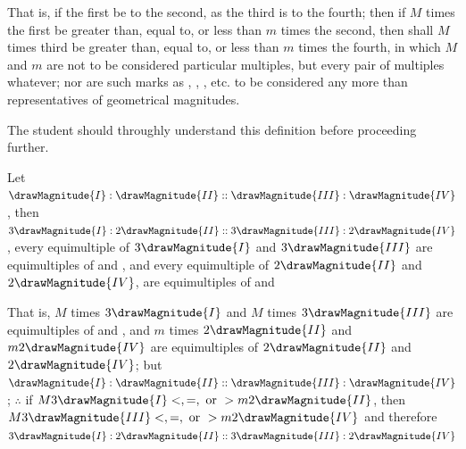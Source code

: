 \documentclass[booklanguage=english]{byrnebook}
\begin{document}
That is, if the first be to the second, as the third is to the fourth; then if $M$ times the first be greater than, equal to, or less than $m$ times the second, then shall $M$ times third be greater than, equal to, or less than $m$ times the fourth, in which $M$ and $m$ are not to be considered particular multiples, but every pair of multiples whatever; nor are such marks as , , , etc. to be considered any more than representatives of geometrical magnitudes.

The student should throughly understand this definition before proceeding further.

\vfill\pagebreak

\label{prop:V.IV}

Let $\drawMagnitude{I} : \drawMagnitude{II} :: \drawMagnitude{III} : \drawMagnitude{IV}$, then $3\drawMagnitude{I} : 2\drawMagnitude{II} :: 3\drawMagnitude{III} : 2\drawMagnitude{IV}$, every equimultiple of $3\drawMagnitude{I}$ and $3\drawMagnitude{III}$ are equimultiples of  and , and every equimultiple of $2\drawMagnitude{II}$ and $2\drawMagnitude{IV}$, are equimultiples of  and  

That is, $M$ times $3\drawMagnitude{I}$ and $M$ times $3\drawMagnitude{III}$ are equimultiples of  and , and $m$ times $2\drawMagnitude{II}$ and $m 2\drawMagnitude{IV}$ are equimultiples of $2\drawMagnitude{II}$ and $2\drawMagnitude{IV}$; but $\drawMagnitude{I} : \drawMagnitude{II} :: \drawMagnitude{III} : \drawMagnitude{IV}$ \byref{\hypref}; $\therefore$ if $M 3\drawMagnitude{I} <, =, \mbox{ or } > m 2 \drawMagnitude{II}$, then $M 3\drawMagnitude{III} <, =, \mbox{ or } > m 2 \drawMagnitude{IV}$  and therefore $3\drawMagnitude{I} : 2\drawMagnitude{II} :: 3\drawMagnitude{III} : 2\drawMagnitude{IV}$ 
\end{document}
